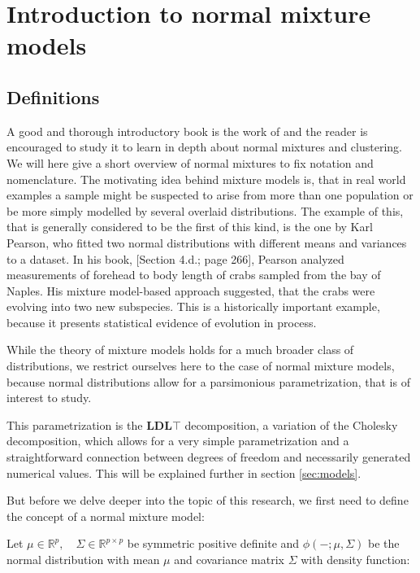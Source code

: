 \chapter{Introduction to normal mixture models}



\section{Definitions}
\label{sec:def}

A good and thorough introductory book is the work of \cite{McL00} and
the reader is encouraged to study it to learn in depth about normal mixtures
and clustering. 
We will here give a short overview of normal mixtures to fix notation and 
nomenclature.
The motivating idea behind mixture models is, that in real world examples
a sample might be suspected to arise from more than one population or be 
more simply modelled by several overlaid distributions.
The example of this, that is generally considered to be the first of this kind,
is the one by Karl Pearson, who fitted two normal distributions with different 
means and variances to a dataset.
In his book, \cite{Pea96}[Section 4.d.; page 266], Pearson analyzed measurements
of forehead to body length of crabs sampled from the bay of Naples. His mixture 
model-based approach suggested, that the crabs were evolving into two new 
subspecies.
This is a historically important example, because it presents statistical 
evidence of evolution in process.

While the theory of mixture models holds for a much broader class of 
distributions, we restrict ourselves here to the case of normal mixture models,
because normal distributions allow for a parsimonious parametrization, that is 
of interest to study.

This parametrization is the $\pmb{LDL}\top$ decomposition, a variation of the 
Cholesky decomposition, which allows for a very 
simple parametrization and a straightforward connection between degrees of 
freedom and necessarily generated numerical values. This will be explained 
further in section \ref{sec:models}.

But before we delve deeper into the topic of this research, we first need to 
define the concept of a normal mixture model:

Let $ \mu \in \mathbb{R}^p , \quad \Sigma \in \mathbb{R}^{p \times p} $ be
symmetric positive definite and $ \phi(- ; \mu, \Sigma) $ be the normal 
distribution with mean $ \mu $ and covariance matrix $ \Sigma $ with density 
function:

